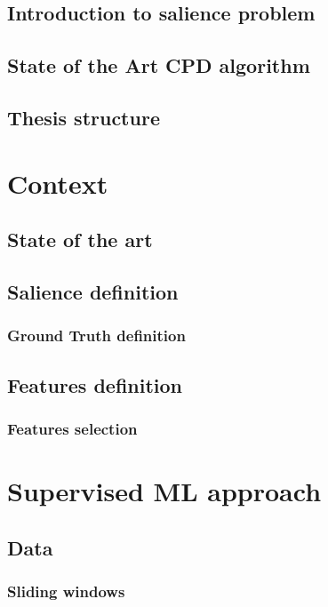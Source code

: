 \documentclass[12pt]{article}
\begin{document}
            \subsection{Introduction to salience problem }
            \subsection{State of the Art CPD algorithm}
            \subsection{Thesis structure}       
        \newpage
        
        \section{Context}
        
            \subsection{State of the art}
            \subsection{Salience definition}
                \subsubsection{Ground Truth definition}
            \subsection{Features definition}
                \subsubsection{Features selection}
        \newpage
        \section{Supervised ML approach}
            \subsection{Data}
                \subsubsection{Sliding windows}
\end{document}

